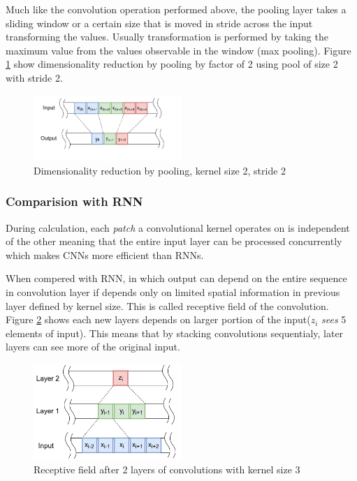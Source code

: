 \documentclass[times, utf8, diplomski, numeric, english]{fer}
\begin{document}
 Much like the convolution operation performed above, the pooling layer takes a sliding window or a certain size that is moved in stride across the input transforming the values. Usually transformation is performed by taking the maximum value from the values observable in the window (max pooling).
Figure \ref{fg:pooling} show dimensionality reduction by pooling by factor of 2 using pool of size 2 with stride 2.
\begin{figure}[!htb]
	\begin{center}
		\includegraphics[width=0.5\textwidth]{./imgs/pooling.png}
		\caption{Dimensionality reduction by pooling, kernel size 2, stride 2}
		\label{fg:pooling}
	\end{center}
\end{figure}




  
\subsubsection{Comparision with RNN}

During calculation, each \textit{patch} a convolutional kernel operates on is independent of the other meaning that the entire input layer can be processed concurrently which makes CNNs more efficient than RNNs. 

When compered with RNN, in which output can depend on the entire sequence in convolution layer if depends only on limited spatial information in previous layer defined by kernel size. This is called receptive field of the convolution. 
 Figure \ref{fg:receptive field} shows each new layers depends on larger portion of the input($z_i$ \textit{sees} 5 elements of input). This means that by stacking convolutions sequentialy, later layers can see more of the original input.


\begin{figure}[!ht]
	\begin{center}
		\includegraphics[width=0.5\textwidth]{./imgs/receptive_field.png}
		\caption{Receptive field after 2 layers of convolutions with kernel size 3}
		\label{fg:receptive field}
	\end{center}
\end{figure}
\end{document}
